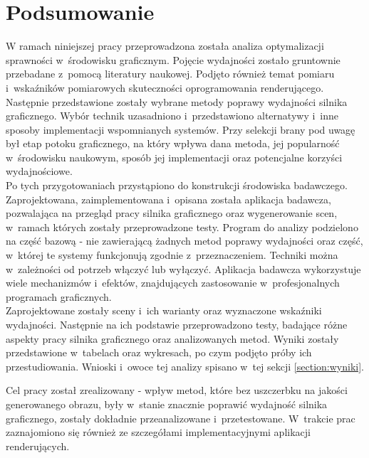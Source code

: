 \documentclass[a4paper,twoside,12pt]{book}
\begin{document}
\chapter{Podsumowanie}

W ramach niniejszej pracy przeprowadzona została analiza optymalizacji sprawności w~środowisku graficznym. Pojęcie wydajności zostało gruntownie przebadane z~pomocą literatury naukowej. Podjęto również temat pomiaru i~wskaźników pomiarowych skuteczności oprogramowania renderującego. \\
Następnie przedstawione zostały wybrane metody poprawy wydajności silnika graficznego. Wybór technik uzasadniono i~przedstawiono alternatywy i~inne sposoby implementacji wspomnianych systemów. Przy selekcji brany pod uwagę był etap potoku graficznego, na który wpływa dana metoda, jej popularność w~środowisku naukowym, sposób jej implementacji oraz potencjalne korzyści wydajnościowe. \\
Po tych przygotowaniach przystąpiono do konstrukcji środowiska badawczego. Zaprojektowana, zaimplementowana i~opisana została aplikacja badawcza, pozwalająca na przegląd pracy silnika graficznego oraz wygenerowanie scen, w~ramach których zostały przeprowadzone testy. Program do analizy podzielono na część bazową - nie zawierającą żadnych metod poprawy wydajności oraz część, w~której te systemy funkcjonują zgodnie z~przeznaczeniem. Techniki można w~zależności od potrzeb włączyć lub wyłączyć. Aplikacja badawcza wykorzystuje wiele mechanizmów i~efektów, znajdujących zastosowanie w~profesjonalnych programach graficznych. \\
Zaprojektowane zostały sceny i~ich warianty oraz wyznaczone wskaźniki wydajności. Następnie na ich podstawie przeprowadzono testy, badające różne aspekty pracy silnika graficznego oraz analizowanych metod. Wyniki zostały przedstawione w~tabelach oraz wykresach, po czym podjęto próby ich przestudiowania. Wnioski i~owoce tej analizy spisano w~tej sekcji \ref{section:wyniki}.

\vbox{}

Cel pracy został zrealizowany - wpływ metod, które bez uszczerbku na jakości generowanego obrazu, były w~stanie znacznie poprawić wydajność silnika graficznego, zostały dokładnie przeanalizowane i~przetestowane. W~trakcie prac zaznajomiono się również ze szczegółami implementacyjnymi aplikacji renderujących.
\end{document}
